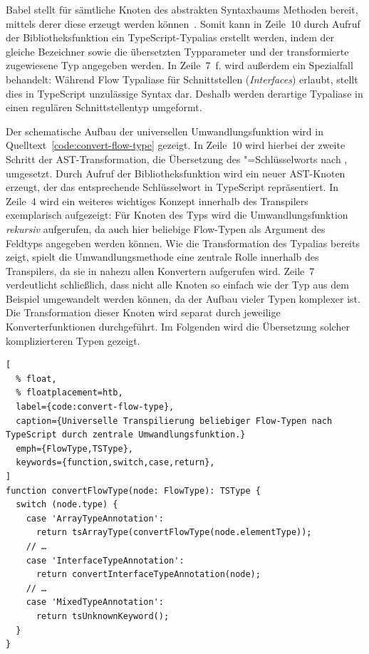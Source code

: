 Babel stellt für sämtliche Knoten des abstrakten Syntaxbaums Methoden bereit, mittels derer diese erzeugt werden können~\autocite{BABEL:TYPES}. Somit kann in Zeile~10 durch Aufruf der Bibliotheksfunktion  ein TypeScript-Typalias erstellt werden, indem der gleiche Bezeichner sowie die übersetzten Typparameter und der transformierte zugewiesene Typ angegeben werden. In Zeile~7~f. wird außerdem ein Spezialfall behandelt: Während Flow Typaliase für Schnittstellen (\textit{Interfaces}) erlaubt, stellt dies in TypeScript unzulässige Syntax dar. Deshalb werden derartige Typaliase in einen regulären Schnittstellentyp umgeformt.

Der schematische Aufbau der universellen Umwandlungsfunktion  wird in Quelltext~\ref{code:convert-flow-type} gezeigt. In Zeile~10 wird hierbei der zweite Schritt der AST-Transformation, die Übersetzung des "=Schlüsselworts nach , umgesetzt. Durch Aufruf der Bibliotheksfunktion  wird ein neuer AST-Knoten erzeugt, der das entsprechende Schlüsselwort in TypeScript repräsentiert.
In Zeile~4 wird ein weiteres wichtiges Konzept innerhalb des Transpilers exemplarisch aufgezeigt: Für Knoten des Typs  wird die Umwandlungsfunktion \emph{rekursiv} aufgerufen, da auch hier beliebige Flow-Typen als Argument des Feldtyps angegeben werden können. Wie die Transformation des Typalias bereits zeigt, spielt die Umwandlungsmethode  eine zentrale Rolle innerhalb des Transpilers, da sie in nahezu allen Konvertern aufgerufen wird. Zeile~7 verdeutlicht schließlich, dass nicht alle Knoten so einfach wie der Typ  aus dem Beispiel umgewandelt werden können, da der Aufbau vieler Typen komplexer ist. Die Transformation dieser Knoten wird separat durch jeweilige Konverterfunktionen durchgeführt. Im Folgenden wird die Übersetzung solcher komplizierteren Typen gezeigt.

\begin{lstlisting}[
  % float,
  % floatplacement=htb,
  label={code:convert-flow-type},
  caption={Universelle Transpilierung beliebiger Flow-Typen nach TypeScript durch zentrale Umwandlungsfunktion.}
  emph={FlowType,TSType},
  keywords={function,switch,case,return},
]
function convertFlowType(node: FlowType): TSType {
  switch (node.type) {
    case 'ArrayTypeAnnotation':
      return tsArrayType(convertFlowType(node.elementType));
    // …
    case 'InterfaceTypeAnnotation':
      return convertInterfaceTypeAnnotation(node);
    // …
    case 'MixedTypeAnnotation':
      return tsUnknownKeyword();
  }
}
\end{lstlisting}


